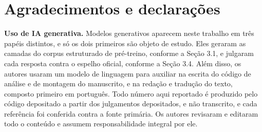 \documentclass{IOS-Book-Article}
\begin{document}
\section*{Agradecimentos e declarações}
\textbf{Uso de IA generativa.} Modelos generativos aparecem neste trabalho em três papéis distintos, e só os dois primeiros são objeto de estudo. Eles geraram as camadas do corpus estruturado de pré-treino, conforme a Seção 3.1, e julgaram cada resposta contra o espelho oficial, conforme a Seção 3.4. Além disso, os autores usaram um modelo de linguagem para auxiliar na escrita do código de análise e de montagem do manuscrito, e na redação e tradução do texto, composto primeiro em português. Todo número aqui reportado é produzido pelo código depositado a partir dos julgamentos depositados, e não transcrito, e cada referência foi conferida contra a fonte primária. Os autores revisaram e editaram todo o conteúdo e assumem responsabilidade integral por ele.
\end{document}
